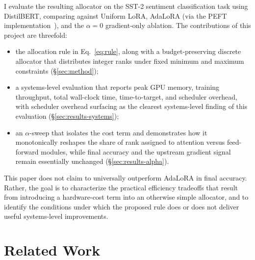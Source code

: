 \documentclass{article}
\begin{document}
I evaluate the resulting allocator on the SST-2 sentiment
classification task \cite{socher2013sst, wang2018glue} using
DistilBERT, comparing against Uniform LoRA,
AdaLoRA \cite{zhang2023adalora} (via the PEFT
implementation~\cite{mangrulkar2022peft}), and the $\alpha = 0$
gradient-only ablation. The contributions of this project are
threefold:
\begin{itemize}
\item the allocation rule in Eq.~\ref{eq:rule}, along with a
      budget-preserving discrete allocator that distributes integer
      ranks under fixed minimum and maximum constraints
      (\S\ref{sec:method});
\item a systems-level evaluation that reports peak GPU memory,
      training throughput, total wall-clock time, time-to-target,
      and scheduler overhead, with scheduler overhead surfacing as
      the clearest systems-level finding of this evaluation
      (\S\ref{sec:results-systems});
\item an $\alpha$-sweep that isolates the cost term and demonstrates
      how it monotonically reshapes the share of rank assigned to
      attention versus feed-forward modules, while final accuracy
      and the upstream gradient signal remain essentially unchanged
      (\S\ref{sec:results-alpha}).
\end{itemize}
This paper does not claim to universally outperform AdaLoRA in final
accuracy. Rather, the goal is to characterize the practical efficiency
tradeoffs that result from introducing a hardware-cost term into an
otherwise simple allocator, and to identify the conditions under which
the proposed rule does or does not deliver useful systems-level
improvements.

\section{Related Work}
\label{sec:related}
\end{document}

